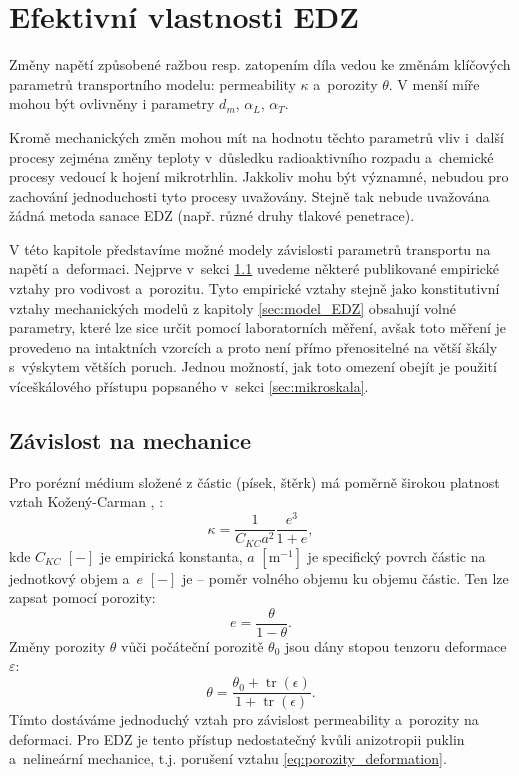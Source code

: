\documentclass{article}
\def\eps{\varepsilon}
\def\tr{\operatorname{tr}}
\begin{document}
\section{Efektivní vlastnosti EDZ}
\label{sec:micro_EDZ}
Změny napětí způsobené ražbou resp. zatopením díla vedou ke změnám klíčových parametrů transportního modelu:
permeability $\kappa$ a~porozity $\theta$. V menší míře mohou být ovlivněny i parametry $d_m$, $\alpha_L$, $\alpha_T$.

Kromě mechanických změn mohou mít na hodnotu těchto parametrů vliv i~další procesy zejména změny teploty v~důsledku radioaktivního rozpadu
a~chemické procesy vedoucí k hojení mikrotrhlin. Jakkoliv mohu být významné, nebudou pro zachování jednoduchosti tyto procesy uvažovány.
Stejně tak nebude uvažována žádná metoda sanace EDZ (např. různé druhy tlakové penetrace).

V této kapitole představíme možné modely závislosti parametrů transportu na napětí a~deformaci.
Nejprve v~sekci \ref{sec:empiricke} uvedeme některé publikované empirické vztahy pro vodivost a~porozitu.
Tyto empirické vztahy stejně jako konstitutivní vztahy mechanických modelů z kapitoly \ref{sec:model_EDZ} 
obsahují volné parametry, které lze sice určit pomocí laboratorních měření, avšak toto měření je provedeno na intaktních vzorcích
a proto není přímo přenositelné na větší škály s~výskytem větších poruch. Jednou možností, jak toto omezení obejít je
použití víceškálového přístupu popsaného v~sekci  \ref{sec:mikroskala}.


\subsection{Závislost na mechanice}
\label{sec:empiricke}

Pro porézní médium složené z částic (písek, štěrk) má poměrně širokou platnost vztah Kožený-Carman \cite{Carman1956}, \cite{Carrier2003}:
\begin{equation}
  \label{eq:Kozeny}
  \kappa = \frac{1}{C_{KC}a^2}\frac{e^3}{1+e},
\end{equation}
kde $C_{KC}$ $[-]$ je empirická konstanta, $a$  $[\mathrm{m}^{-1}]$ je specifický povrch částic na jednotkový objem a~$e$ $[-]$ je   --
poměr volného objemu ku objemu částic. Ten lze zapsat pomocí porozity:
\[
   e = \frac{\theta}{1 - \theta}.
\]
Změny porozity $\theta$ vůči počáteční porozitě $\theta_0$ jsou dány stopou tenzoru deformace $\eps$:
\begin{equation}
   \label{eq:porozity_deformation}
   \theta = \frac{\theta_0 + \tr(\epsilon)}{1 + \tr(\epsilon)}.
\end{equation}
Tímto dostáváme jednoduchý vztah pro závislost permeability a~porozity na deformaci. Pro EDZ je tento přístup nedostatečný kvůli anizotropii
puklin a~nelineární mechanice, t.j.  porušení vztahu \eqref{eq:porozity_deformation}.
\end{document}
